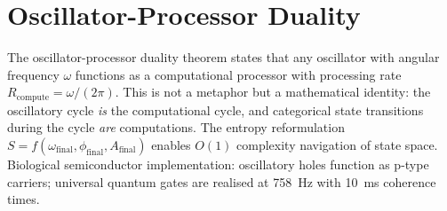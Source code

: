 \chapter{Oscillator-Processor Duality}
\label{ch:processor}


\begin{chapterabstract}
The oscillator-processor duality theorem states that any oscillator with angular frequency $\omega$ functions as a computational processor with processing rate $R_{\mathrm{compute}} = \omega/(2\pi)$. This is not a metaphor but a mathematical identity: the oscillatory cycle \emph{is} the computational cycle, and categorical state transitions during the cycle \emph{are} computations. The entropy reformulation $S = f(\omega_{\mathrm{final}}, \phi_{\mathrm{final}}, A_{\mathrm{final}})$ enables $O(1)$ complexity navigation of state space. Biological semiconductor implementation: oscillatory holes function as p-type carriers; universal quantum gates are realised at 758~Hz with 10~ms coherence times.
\end{chapterabstract}


